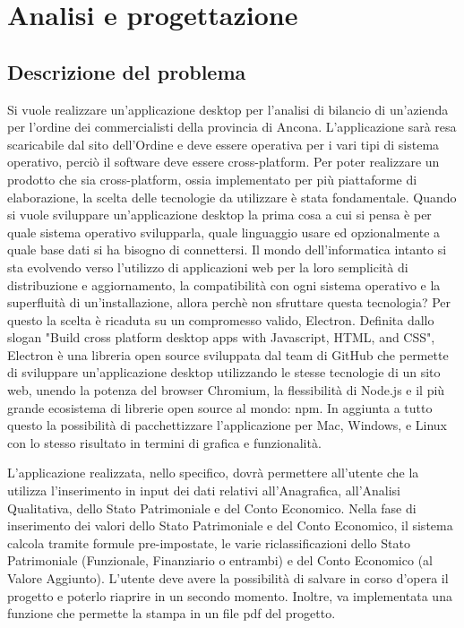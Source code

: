 
\chapter{Analisi e progettazione}


\section{Descrizione del problema}

Si vuole realizzare un'applicazione desktop per l'analisi di bilancio di un'azienda per l'ordine dei commercialisti della provincia di Ancona.
L'applicazione sarà resa scaricabile dal sito dell'Ordine e deve essere operativa per i vari tipi di sistema operativo, perciò il software deve essere cross-platform.
Per poter realizzare un prodotto che sia cross-platform, ossia implementato per più piattaforme di elaborazione, la scelta delle tecnologie da utilizzare è stata fondamentale.
Quando si vuole sviluppare un'applicazione desktop la prima cosa a cui si pensa è per quale sistema operativo svilupparla, quale linguaggio usare ed opzionalmente a quale base dati si ha bisogno di connettersi.
Il mondo dell'informatica intanto si sta evolvendo verso l'utilizzo di applicazioni web per la loro semplicità di distribuzione e aggiornamento, la compatibilità con ogni sistema operativo e la superfluità di un'installazione, allora perchè non sfruttare questa tecnologia?
Per questo la scelta è ricaduta su un compromesso valido, Electron.
Definita dallo slogan "Build cross platform desktop apps with Javascript, HTML, and CSS", Electron è una libreria open source sviluppata dal team di GitHub che permette di sviluppare un’applicazione desktop utilizzando le stesse tecnologie di un sito web, unendo la potenza del browser Chromium, la flessibilità di Node.js e il più grande ecosistema di librerie open source al mondo: npm. In aggiunta a tutto questo la possibilità di pacchettizzare l’applicazione per Mac, Windows, e Linux con lo stesso risultato in termini di grafica e funzionalità.

L'applicazione realizzata, nello specifico, dovrà permettere all'utente che la utilizza l'inserimento in input dei dati relativi all'Anagrafica, all'Analisi Qualitativa, dello Stato Patrimoniale e del Conto Economico.
Nella fase di inserimento dei valori dello Stato Patrimoniale e del Conto Economico, il sistema calcola tramite formule pre-impostate, le varie riclassificazioni dello Stato Patrimoniale (Funzionale, Finanziario o entrambi) e del Conto Economico (al Valore Aggiunto).
L'utente deve avere la possibilità di salvare in corso d'opera il progetto e poterlo riaprire in un secondo momento.
Inoltre, va implementata una funzione che permette la stampa in un file pdf del progetto.



